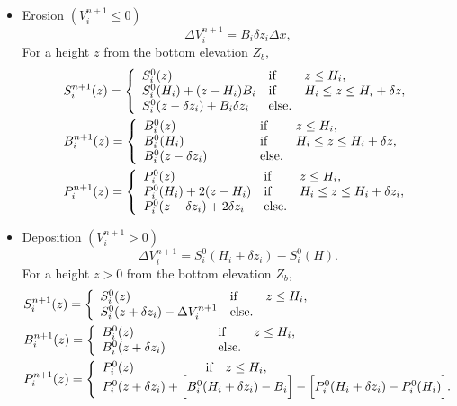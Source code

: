 \begin{itemize}
\item Erosion $(V_i^{n+1} \leq 0)$
  \begin{equation}\label{eq:thickness-of-erosion}
\Delta V_i^{n+1} = B_i\delta z_i\Delta x,
  \end{equation}
For a height $z$ from the bottom elevation $Z_b$,
  \begin{align*}
    	& S_i^{n+1}(z) = \left\{\begin{array}{lll}
	S_i^0(z) & \text{if} & z \leq H_i, \\
	S_i^0(H_i) + (z-H_i)B_i & \text{if} & H_i \leq z \leq H_i + \delta z, \\
	S_i^0(z-\delta z_i) + B_i\delta z_i & \text{else.}
	\end{array}\right. \\
	& B_i^{n+1}(z) = \left\{\begin{array}{lll}
	B_i^0(z) \hspace*{2cm} & \text{if} & z \leq H_i, \\
	B_i^0(H_i) & \text{if} & H_i \leq z \leq H_i + \delta z, \\
	B_i^0(z-\delta z_i) & \text{else.}
	\end{array}\right.\\
	& P_i^{n+1}(z) = \left\{\begin{array}{lll}
	P_i^0(z) & \text{if} & z \leq H_i, \\
	P_i^0(H_i) + 2(z-H_i) & \text{if} & H_i \leq z \leq H_i + \delta z_i, \\
	P_i^0(z-\delta z_i) + 2\delta z_i & \text{else.}
	\end{array}\right.
  \end{align*}

\item Deposition $(V_i^{n+1} > 0)$
   \begin{equation}\label{eq:thickness-of-deposition}
\Delta V_i^{n+1} = S_i^0(H_i + \delta z_i) - S_i^0(H).
   \end{equation}
For a height $z > 0$ from the bottom elevation $Z_b$,
   \begin{align*}
	& S_i^{n+1}(z) = \left\{\begin{array}{lll}
	S_i^0(z) & \text{if} & z \leq H_i, \\
	S_i^0(z+\delta z_i) - \Delta V_i^{n+1} & \text{else.}
	\end{array}\right. \\
	& B_i^{n+1}(z) = \left\{\begin{array}{lll}
	B_i^0(z) \hspace*{2cm} & \text{if} & z \leq H_i, \\
	B_i^0(z+\delta z_i) & \text{else.}
	\end{array}\right. \\
	& P_i^{n+1}(z) = \left\{\begin{array}{l}
	P_i^0(z) \hspace*{2cm} \text{if} \quad z \leq H_i, \\
	P_i^0(z+\delta z_i) + \Big[B_i^0(H_i+\delta z_i) - B_i\Big] - \Big[P_i^0(H_i+\delta z_i) - P_i^0(H_i)\Big].
	\end{array}\right.
	\end{align*}
\end{itemize}

